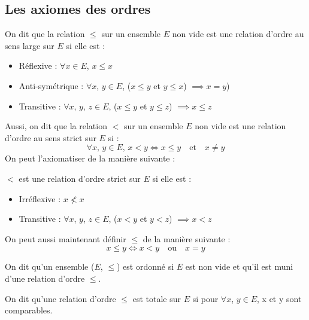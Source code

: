 \subsection{Les axiomes des ordres}


\begin{definition}

	On dit que la relation $\leqslant$ sur un ensemble $E$ non vide est une relation d'ordre au sens large sur $E$ si elle est :
	\begin{itemize}
		\item Réflexive : $\forall x \in E$, $x \leqslant x$
		\item Anti-symétrique : $\forall x$, $y \in E$, ($x \leqslant y$ et $y \leqslant x$) $\implies x = y$)
		\item Transitive : $\forall x$, $y$, $z \in E$, ($x \leqslant y$ et $y \leqslant z$) $\implies x \leqslant z$
	\end{itemize}

	Aussi, on dit que la relation $<$ sur un ensemble $E$ non vide est une relation d'ordre au sens strict sur $E$ si :
	\begin{equation*}
		\forall x,\,y \in E,\,x < y \iff x \leqslant y \quad \text{et} \quad x \ne y
	\end{equation*}
	On peut l'axiomatiser de la manière suivante :

	$<$ est une relation d'ordre strict sur $E$ si elle est :
	\begin{itemize}
		\item Irréflexive : $x \nless x$
		\item Transitive : $\forall x$, $y$, $z \in E$, ($x < y$ et $y < z$) $\implies x < z$
	\end{itemize}
	On peut aussi maintenant définir $\leqslant$ de la manière suivante :
	\begin{equation*}
		x \leq y \iff  x < y \quad \text{ou} \quad  x = y
	\end{equation*}

\end{definition}


\begin{definition}

	On dit qu'un ensemble ($E$, $\leqslant$) est ordonné si $E$ est non vide et qu'il est muni d'une relation d'ordre $\leqslant$.

\end{definition}

\begin{definition}

	On dit qu'une relation d'ordre $\leqslant$ est totale sur $E$ si pour $\forall x$, $y \in E$, x et y sont comparables.

\end{definition}

